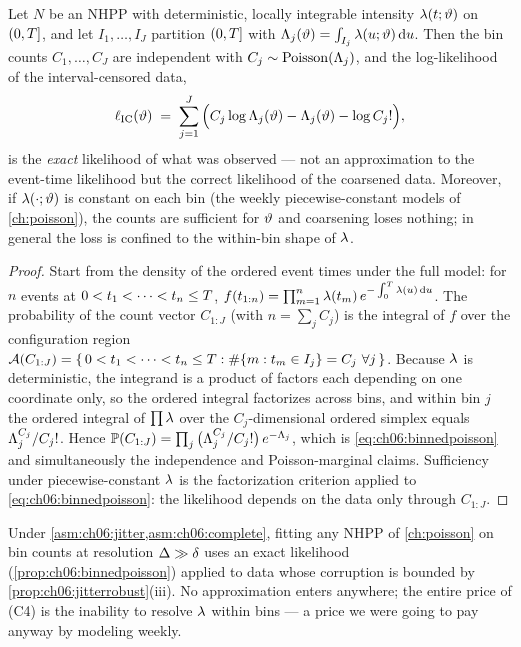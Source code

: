 \begin{proposition}\label{prop:ch06:binnedpoisson}
Let $N$ be an NHPP with deterministic, locally integrable intensity
$\lambda(t;\vartheta)$ on $(0,T]$, and let $I_1,\dots,I_J$ partition
$(0,T]$ with $\Lambda_j(\vartheta) = \int_{I_j}\lambda(u;\vartheta)\,\mathrm{d} u$.
Then the bin counts $C_1,\dots,C_J$ are independent with
$C_j \sim \mathrm{Poisson}(\Lambda_j)$, and the log-likelihood of the
interval-censored data,
\begin{equation}\label{eq:ch06:binnedpoisson}
\ell_{\mathrm{IC}}(\vartheta)
 \;=\;
 \sum_{j=1}^{J}\Big( C_j \log \Lambda_j(\vartheta) - \Lambda_j(\vartheta)
 - \log C_j! \Big),
\end{equation}
is the \emph{exact} likelihood of what was observed --- not an
approximation to the event-time likelihood but the correct likelihood of
the coarsened data. Moreover, if $\lambda(\cdot;\vartheta)$ is constant on
each bin (the weekly piecewise-constant models of \cref{ch:poisson}), the
counts are sufficient for $\vartheta$ and coarsening loses nothing; in
general the loss is confined to the within-bin shape of $\lambda$.
\end{proposition}

\begin{proof}
Start from the density of the ordered event times under the full model: for
$n$ events at $0 < t_1 < \cdots < t_n \le T$,
$f(t_{1:n}) = \prod_{m=1}^{n}\lambda(t_m)\,
e^{-\int_0^{T}\lambda(u)\,\mathrm{d} u}$. The probability of the count vector
$C_{1:J}$ (with $n = \sum_j C_j$) is the integral of $f$ over the
configuration region
$\mathcal{A}(C_{1:J}) = \{\,0<t_1<\cdots<t_n\le T :
\#\{m: t_m \in I_j\} = C_j \ \forall j\,\}$. Because $\lambda$ is
deterministic, the integrand is a product of factors each depending on one
coordinate only, so the ordered integral factorizes across bins, and within
bin $j$ the ordered integral of $\prod\lambda$ over the $C_j$-dimensional
ordered simplex equals $\Lambda_j^{C_j}/C_j!$. Hence
$\mathbb{P}(C_{1:J}) = \prod_j \big(\Lambda_j^{C_j}/C_j!\big)\,e^{-\Lambda_j}$, which
is \cref{eq:ch06:binnedpoisson} and simultaneously the independence and
Poisson-marginal claims. Sufficiency under piecewise-constant $\lambda$ is the
factorization criterion applied to \cref{eq:ch06:binnedpoisson}: the
likelihood depends on the data only through $C_{1:J}$.
\end{proof}

\begin{corollary}\label{cor:ch06:resolutiononly}
Under \cref{asm:ch06:jitter,asm:ch06:complete}, fitting any NHPP of
\cref{ch:poisson} on bin counts at resolution $\Delta \gg \delta$ uses an
exact likelihood (\cref{prop:ch06:binnedpoisson}) applied to data whose
corruption is bounded by \cref{prop:ch06:jitterrobust}(iii). No
approximation enters anywhere; the entire price of (C4) is the inability to
resolve $\lambda$ within bins --- a price we were going to pay anyway by
modeling weekly.
\end{corollary}

